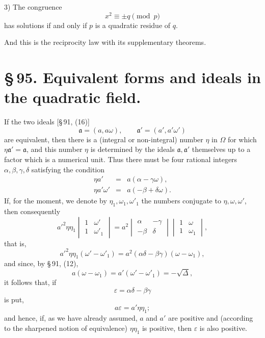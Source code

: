 \documentclass[11pt]{article}
\begin{document}
3) The congruence
\[
 x^2\equiv\pm q\pmod p
\]
has solutions if and only if $p$ is a quadratic residue of $q$.

And this is the reciprocity law with its supplementary theorems.



\section*{\S\,95. Equivalent forms and ideals in the quadratic field.}

If the two ideals [\S\,91, (16)]
\begin{equation}
 \mathfrak a=(a,a\omega),\qquad \mathfrak a'=(a',a'\omega')
\tag{1}
\end{equation}
are equivalent, then there is a (integral or non-integral) number $\eta$ in $\Omega$ for which $\eta\mathfrak a'=\mathfrak a$, and this number $\eta$ is determined by the ideals $\mathfrak a,\mathfrak a'$ themselves up to a factor which is a numerical unit. Thus there must be four rational integers $\alpha,\beta,\gamma,\delta$ satisfying the condition
\begin{equation}
\begin{array}{rcl}
 \eta a'&=&a(\alpha-\gamma\omega),\\
 \eta a'\omega'&=&a(-\beta+\delta\omega).
\end{array}
\tag{2}
\end{equation}
If, for the moment, we denote by $\eta_1,\omega_1,\omega'_1$ the numbers conjugate to $\eta,\omega,\omega'$, then consequently
\[
 a'^2\eta\eta_1
 \begin{vmatrix}1&\omega'\\[0.15em]1&\omega'_1\end{vmatrix}
 =a^2
 \begin{vmatrix}\alpha&-\gamma\\[0.15em]-\beta&\delta\end{vmatrix}
 \begin{vmatrix}1&\omega\\[0.15em]1&\omega_1\end{vmatrix},
\]
that is,
\[
 a'^2\eta\eta_1(\omega'-\omega'_1)=a^2(\alpha\delta-\beta\gamma)(\omega-\omega_1),
\]
and since, by \S\,91, (12),
\[
 a(\omega-\omega_1)=a'(\omega'-\omega'_1)=-\sqrt{\Delta},
\]
it follows that, if
\[
 \varepsilon=\alpha\delta-\beta\gamma
\]
is put,
\begin{equation}
 a\varepsilon=a'\eta\eta_1;
\tag{3}
\end{equation}
and hence, if, as we have already assumed, $a$ and $a'$ are positive and (according to the sharpened notion of equivalence) $\eta\eta_1$ is positive, then $\varepsilon$ is also positive.
\end{document}
